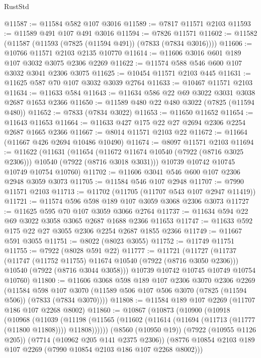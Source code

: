 \begin{lexlean}{RustStd}
\begin{coremodule}
@11587 := @11584 @582 @107 @3016
@11589 := @7817 @11571 @2103
@11593 := @11589 @491 @107 @491 @3016
@11594 := @7826 @11571
@11602 := @11582 (@11587 (@11593 (@7825 (@11594 @491)) (@7833 (@7834 @3016))))
@11606 := @10766 @11571 @2103 @2135 @10770
@11614 := @11606 @3016 @601 @189 @107 @3032 @3075 @2306 @2269
@11622 := @11574 @588 @546 @600 @107 @3032 @3041 @2306 @3075
@11625 := @10454 @11571 @2103 @445
@11631 := @11625 @587 @70 @107 @3032 @3039 @2764
@11633 := @10467 @11571 @2103
@11634 := @11633 @584
@11643 := @11634 @586 @22 @69 @3022 @3031 @3038 @2687 @1653 @2366
@11650 := @11589 @480 @22 @480 @3022 (@7825 (@11594 @480))
@11652 := @7833 (@7834 @3022)
@11653 := @11650 @11652
@11654 := @11643 @11653
@11664 := @11633 @427 @175 @22 @27 @2694 @2306 @2254 @2687 @1665 @2366
@11667 := @8014 @11571 @2103 @22
@11672 := @11664 (@11667 @426 @2694 @10486 @10490)
@11674 := @8097 @11571 @2103
@11694 := @11622
    (@11631
      (@11654 (@11672 @11674 @10540 (@7922 (@8716 @3025 @2306))) @10540 (@7922 (@8716 @3018 @3031)))
      @10739
      @10742
      @10745
      @10749
      @10754
      @10760)
@11702 := @11606 @3041 @546 @600 @107 @2306 @2948 @3059 @3073
@11705 := @11584 @546 @107 @2948
@11707 := @7990 @11571 @2103
@11713 := @11702 (@11705 (@11707 @543 @107 @2947 @11419))
@11721 := @11574 @596 @598 @189 @107 @3059 @3068 @2306 @3073
@11727 := @11625 @595 @70 @107 @3059 @3066 @2764
@11737 := @11634 @594 @22 @69 @3022 @3058 @3065 @2687 @1688 @2366 @11653
@11747 := @11633 @592 @175 @22 @27 @3055 @2306 @2254 @2687 @1855 @2366
@11749 := @11667 @591 @3055
@11751 := @8022 (@8023 @3055)
@11752 := @11749 @11751
@11755 := @7922 (@8028 @591 @22)
@11777 := @11721
    (@11727
      (@11737
        (@11747 (@11752 @11755) @11674 @10540 (@7922 (@8716 @3050 @2306)))
        @10540
        (@7922 (@8716 @3044 @3058)))
      @10739
      @10742
      @10745
      @10749
      @10754
      @10760)
@11800 := @11606
    @3068
    @598
    @189
    @107
    @2306
    @3070
    @2306
    @2269
    (@11584
      @598
      @107
      @3070
      (@11589 @506 @107 @506 @3070 (@7825 (@11594 @506)) (@7833 (@7834 @3070))))
@11808 := @11584 @189 @107 @2269 (@11707 @186 @107 @2268 @8002)
@11860 := @10867
    (@10873
      (@10900
        (@10918
          (@10968
            (@11039
              (@11198
                (@11565 (@11602 (@11614 (@11694 (@11713 (@11777 (@11800 @11808)))) @11808))))))
          (@8560 (@10950 @19))
          (@7922 (@10955 @1126 @205))
          (@7714 (@10962 @205 @141 @2375 @2306))
          (@8776 @10854 @2103 @189 @107 @2269 (@7990 @10854 @2103 @186 @107 @2268 @8002)))

\end{coremodule}
\end{lexlean}
